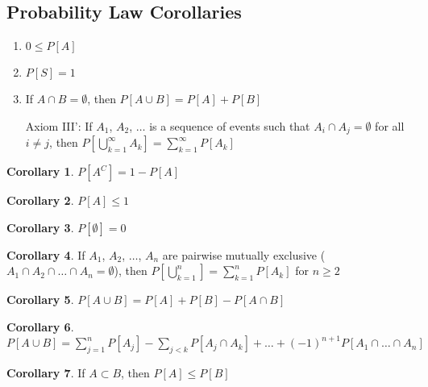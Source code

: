 \documentclass[10pt,letterpaper,final,twoside,notitlepage]{article}
\theoremstyle{plain}
\theoremstyle{definition}
\newtheorem{corollary}{Corollary}[section]
\begin{document}
	\subsection{Probability Law Corollaries} \label{subsec:Probability Law Corollary}
		\begin{enumerate}[label=Axiom~\Roman*:, align=left, noitemsep, nolistsep] %
			\item $0 \leq P\left[ A \right]$
			\item $P \left[ S \right] = 1$
			\item If $A \cap B = \emptyset$, then $P \left[ A \cup B \right] = P \left[ A \right] + P \left[ B \right]$
			\item[Axiom III':] If $A_{1}$, $A_{2}$, $\ldots$ is a sequence of events such that $A_{i} \cap A_{j} = \emptyset$ for all $i \neq j$, then $P \left[ \bigcup_{k=1}^{\infty} A_{k} \right] = \sum_{k=1}^{\infty} P \left[ A_{k} \right]$
		\end{enumerate}
		\begin{corollary} \label{cor:Probability Parts}
			$P \left[ A^{C} \right] = 1 - P \left[ A \right]$
		\end{corollary}
		\begin{corollary} \label{cor:Probability of Event}
			$P \left[ A \right] \leq 1$
		\end{corollary}
		\begin{corollary} \label{cor:Probability of Empty Set}
			$P \left[ \emptyset \right] = 0$
		\end{corollary}
		\begin{corollary} \label{cor: Probability Addition of Disjoint Pairs}
			If $A_{1}$, $A_{2}$, $\ldots$, $A_{n}$ are pairwise mutually exclusive ($A_{1} \cap A_{2} \cap \ldots \cap A_{n} = \emptyset$), then $P \left[ \bigcup_{k=1}^{n} \right] = \sum_{k=1}^{n} P \left[ A_{k} \right]$ for $n \geq 2$
		\end{corollary}
		\begin{corollary} \label{cor:Inclusion-Exclusion Principle to 2 Sets}
			$P \left[ A \cup B \right] = P \left[ A \right] + P \left[ B \right] - P \left[ A \cap B \right]$
		\end{corollary}
		\begin{corollary} \label{cor:Inclusion-Exclusion Principle to n Sets}
			$P \left[ A \cup B \right] = \sum_{j=1}^{n} P \left[ A_{j} \right] - \sum_{j<k} P \left[A_{j} \cap A_{k} \right] + \ldots + \left( -1 \right)^{n+1} P \left[ A_{1} \cap \ldots \cap A_{n} \right]$
		\end{corollary}
		\begin{corollary} \label{cor:Subset Probability to Superset}
			If $A \subset B$, then $P \left[ A \right] \leq P \left[ B \right]$
		\end{corollary}
	
\end{document}
